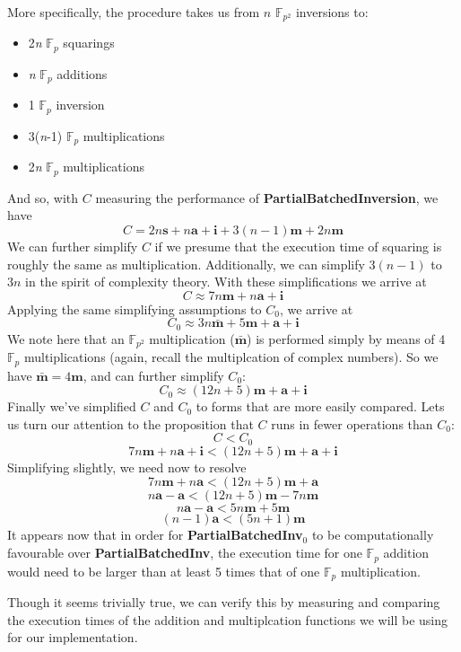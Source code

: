 More specifically, the procedure takes us from $n$ $\mathbb{F}_{p^{2}}$  inversions to: 
\begin{center}
\begin{itemize}
\item 2\textit{n} $\mathbb{F}_{p}$ squarings
\item \textit{n} $\mathbb{F}_{p}$ additions
\item 1 $\mathbb{F}_{p}$ inversion
\item 3(\textit{n}-1) $\mathbb{F}_{p}$ multiplications
\item 2\textit{n} $\mathbb{F}_{p}$ multiplications
\end{itemize}
\end{center}
\noindent
And so, with $C$ measuring the performance of \textbf{PartialBatchedInversion}, we have
$$
C = 2n\textbf{s} + n\textbf{a} + \textbf{i} + 3(n-1)\textbf{m} + 2n\textbf{m}
$$
We can further simplify $C$ if we presume that the execution time of squaring is roughly the same as multiplication. Additionally, we can simplify $3(n-1)$ to $3n$ in the spirit of complexity theory. With these simplifications we arrive at
$$
C \approx 7n\textbf{m} + n\textbf{a} + \textbf{i}
$$
Applying the same simplifying assumptions to $C_0$, we arrive at
$$
C_0 \approx 3n\bar{\textbf{m}} + 5\textbf{m} + \textbf{a} + \textbf{i} 
$$
We note here that an $\mathbb{F}_{p^2}$ multiplication ($\bar{\textbf{m}}$) is performed simply by means of 4 $\mathbb{F}_{p}$ multiplications (again, recall the multiplcation of complex numbers). So we have $\bar{\textbf{m}} = 4\textbf{m}$, and can further simplify $C_0$:
$$
C_0 \approx (12n + 5)\textbf{m} + \textbf{a} + \textbf{i}
$$
Finally we've simplified $C$ and $C_0$ to forms that are more easily compared. Lets us turn our attention to the proposition that $C$ runs in fewer operations than $C_0$:
$$
C < C_0
$$
$$
7n\textbf{m} + n\textbf{a} + \textbf{i} < (12n + 5)\textbf{m} + \textbf{a} + \textbf{i}
$$
Simplifying slightly, we need now to resolve
$$
7n\textbf{m} + n\textbf{a} < (12n + 5)\textbf{m} + \textbf{a}
$$
$$
n\textbf{a} - \textbf{a} < (12n + 5)\textbf{m} - 7n\textbf{m}
$$
$$
n\textbf{a} - \textbf{a} < 5n\textbf{m} + 5\textbf{m}
$$
$$
(n - 1)\textbf{a} < (5n + 1)\textbf{m}
$$
It appears now that in order for \textbf{PartialBatchedInv}$_0$ to be computationally favourable over \textbf{PartialBatchedInv}, the execution time for one $\mathbb{F}_p$ addition would need to be larger than at least 5 times that of one $\mathbb{F}_p$ multiplication. 

Though it seems trivially true, we can verify this by measuring and comparing the execution times of the \sidh addition and multiplcation functions we will be using for our implementation.

